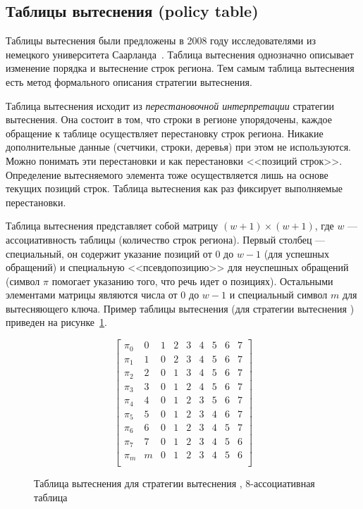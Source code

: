\subsection{Таблицы вытеснения (policy table)}\label{sec:policy_table}

Таблицы вытеснения были предложены в 2008 году исследователями из немецкого университета Саарланда~\cite{policy_tables}. Таблица вытеснения однозначно описывает изменение порядка и вытеснение строк региона. Тем самым таблица вытеснения есть метод формального описания стратегии вытеснения.

Таблица вытеснения исходит из \emph{перестановочной интерпретации} стратегии
вытеснения. Она состоит в том, что строки в регионе упорядочены, каждое
обращение к таблице осуществляет перестановку строк региона.
Никакие дополнительные данные (счетчики, строки, деревья) при этом не используются. Можно понимать эти перестановки и как перестановки <<позиций строк>>.
Определение вытесняемого элемента тоже осуществляется лишь на основе текущих
позиций строк. Таблица вытеснения как раз фиксирует выполняемые перестановки.

Таблица вытеснения представляет собой матрицу $(w{+}1) \times (w{+}1)$, где $w$
--- ассоциативность таблицы (количество строк региона). Первый столбец ---
специальный, он содержит указание позиций от 0 до $w{-}1$ (для успешных обращений) и специальную <<псевдопозицию>> для неуспешных обращений (символ $\pi$ помогает
указанию того, что речь идет о позициях). Остальными элементами
матрицы являются числа от 0 до $w{-}1$ и специальный символ $m$ для
вытесняющего ключа. Пример таблицы вытеснения (для стратегии
вытеснения \LRU) приведен на рисунке~\ref{fig:PolicyTableLRU8}.

\begin{figure}[h]
$$ \left[
     \begin{array}{c|cccccccc}
       \pi_0 & 0 & 1 & 2 & 3 & 4 & 5 & 6 & 7 \\
       \pi_1 & 1 & 0 & 2 & 3 & 4 & 5 & 6 & 7 \\
       \pi_2 & 2 & 0 & 1 & 3 & 4 & 5 & 6 & 7 \\
       \pi_3 & 3 & 0 & 1 & 2 & 4 & 5 & 6 & 7 \\
       \pi_4 & 4 & 0 & 1 & 2 & 3 & 5 & 6 & 7 \\
       \pi_5 & 5 & 0 & 1 & 2 & 3 & 4 & 6 & 7 \\
       \pi_6 & 6 & 0 & 1 & 2 & 3 & 4 & 5 & 7 \\
       \pi_7 & 7 & 0 & 1 & 2 & 3 & 4 & 5 & 6 \\
       \pi_m & m & 0 & 1 & 2 & 3 & 4 & 5 & 6 \\
     \end{array}
   \right]
$$
\caption{Таблица вытеснения для стратегии вытеснения \LRU,
8-ассоциативная таблица}\label{fig:PolicyTableLRU8}
\end{figure}

